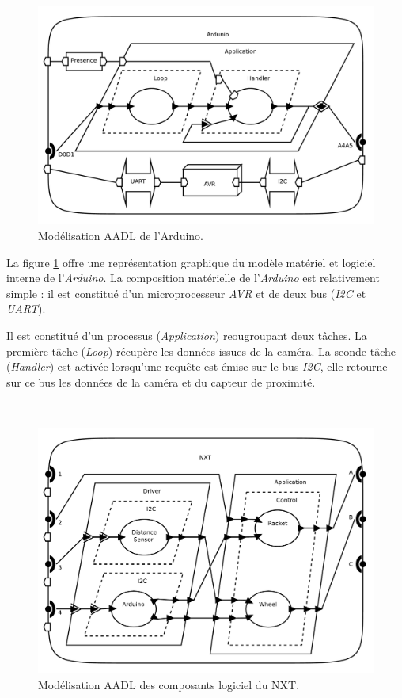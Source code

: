       ~

      \begin{figure}[!ht]
        \centering
        \includegraphics[scale=0.25]{./img/aadl-arduino.pdf}
        \caption{Modélisation AADL de l'Arduino.}
        \label{fig:aadl-arduino}
      \end{figure}
      
      La figure \ref{fig:aadl-arduino} offre une représentation graphique du
      modèle matériel et logiciel interne de l'{\it Arduino}. La composition
      matérielle de l'{\it Arduino} est relativement simple : il est constitué
      d'un microprocesseur {\it AVR} et de deux bus ({\it I2C} et {\it UART}).
      
      Il est constitué d'un processus ({\it Application}) reougroupant deux
      tâches. La première tâche ({\it Loop}) récupère les données issues de la
      caméra. La seonde tâche ({\it Handler}) est activée lorsqu'une requête est
      émise sur le bus {\it I2C}, elle retourne sur ce bus les données de la
      caméra et du capteur de proximité.
      
      ~

      \begin{figure}[!ht]
        \centering
        \includegraphics[scale=0.25]{./img/aadl-nxt2s.pdf}
        \caption{Modélisation AADL des composants logiciel du NXT.}
        \label{fig:aadl-nxt2s}
      \end{figure}

